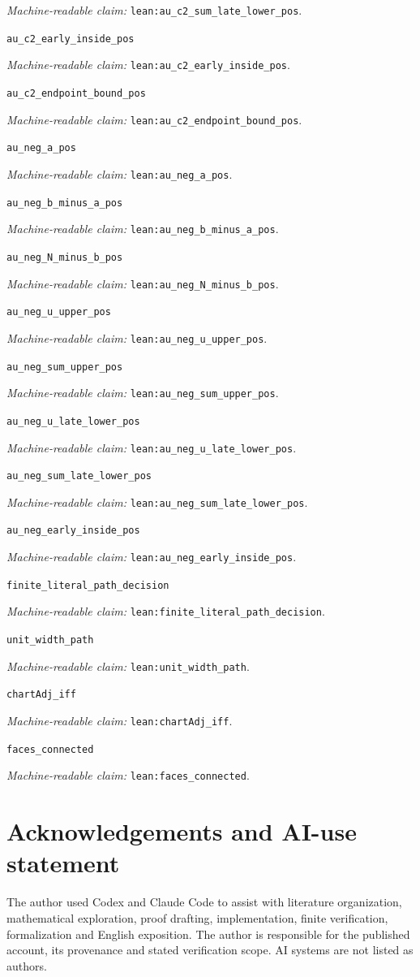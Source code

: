 \documentclass[11pt]{amsart}
\newcommand{\record}[1]{\nolinkurl{#1}}
\newcommand{\claimid}[1]{\par\nopagebreak\noindent\textit{Machine-readable claim:} \record{#1}.\par}
\begin{document}
\claimid{lean:au_c2_sum_late_lower_pos}
\par\noindent\label{lean:au_c2_early_inside_pos}\record{au_c2_early_inside_pos}
\claimid{lean:au_c2_early_inside_pos}
\par\noindent\label{lean:au_c2_endpoint_bound_pos}\record{au_c2_endpoint_bound_pos}
\claimid{lean:au_c2_endpoint_bound_pos}
\par\noindent\label{lean:au_neg_a_pos}\record{au_neg_a_pos}
\claimid{lean:au_neg_a_pos}
\par\noindent\label{lean:au_neg_b_minus_a_pos}\record{au_neg_b_minus_a_pos}
\claimid{lean:au_neg_b_minus_a_pos}
\par\noindent\label{lean:au_neg_N_minus_b_pos}\record{au_neg_N_minus_b_pos}
\claimid{lean:au_neg_N_minus_b_pos}
\par\noindent\label{lean:au_neg_u_upper_pos}\record{au_neg_u_upper_pos}
\claimid{lean:au_neg_u_upper_pos}
\par\noindent\label{lean:au_neg_sum_upper_pos}\record{au_neg_sum_upper_pos}
\claimid{lean:au_neg_sum_upper_pos}
\par\noindent\label{lean:au_neg_u_late_lower_pos}\record{au_neg_u_late_lower_pos}
\claimid{lean:au_neg_u_late_lower_pos}
\par\noindent\label{lean:au_neg_sum_late_lower_pos}\record{au_neg_sum_late_lower_pos}
\claimid{lean:au_neg_sum_late_lower_pos}
\par\noindent\label{lean:au_neg_early_inside_pos}\record{au_neg_early_inside_pos}
\claimid{lean:au_neg_early_inside_pos}
\par\noindent\label{lean:finite_literal_path_decision}\record{finite_literal_path_decision}
\claimid{lean:finite_literal_path_decision}

\par\noindent\label{lean:unit_width_path}\record{unit_width_path}
\claimid{lean:unit_width_path}
\par\noindent\label{lean:chartAdj_iff}\record{chartAdj_iff}
\claimid{lean:chartAdj_iff}
\par\noindent\label{lean:faces_connected}\record{faces_connected}
\claimid{lean:faces_connected}

\section*{Acknowledgements and AI-use statement}
The author used Codex and Claude Code to assist with literature
organization, mathematical exploration, proof drafting, implementation,
finite verification, formalization and English exposition. The author
is responsible for the published account, its provenance and stated
verification scope. AI systems are not listed as authors.
\end{document}
